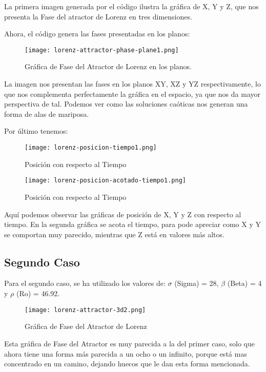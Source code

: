 \documentclass[a4paper]{article}
\begin{document}
La primera imagen generada por el código ilustra la gráfica de X, Y y Z, que nos presenta la Fase del atractor de Lorenz en tres dimensiones. 

Ahora, el código genera las fases presentadas en los planos:
\begin{figure}[h!]
  \centering
  \texttt{[image: lorenz-attractor-phase-plane1.png]}
   \caption{Gráfica de Fase del Atractor de Lorenz en los planos.}
\end{figure}

La imagen nos presentan las fases en los planos XY, XZ y YZ respectivamente, lo que nos complementa perfectamente la gráfica en el espacio, ya que nos da mayor perspectiva de tal. Podemos ver como las soluciones caóticas nos generan una forma de alas de mariposa. 

\pagebreak

Por último tenemos:

\begin{figure}[ht!]
  \centering
  \texttt{[image: lorenz-posicion-tiempo1.png]}
   \caption{Posición con respecto al Tiempo}
\end{figure}

\begin{figure}[ht!]
  \centering
  \texttt{[image: lorenz-posicion-acotado-tiempo1.png]}
  \caption{Posición con respecto al Tiempo}
\end{figure}

Aquí podemos observar las gráficas de posición de X, Y y Z con respecto al tiempo. En la segunda gráfica se acota el tiempo, para pode apreciar como X y Y se comportan muy parecido, mientras que Z está en valores más altos. 

\subsection{Segundo Caso}
Para el segundo caso, se ha utilizado los valores de:
$\sigma$ (Sigma) = 28, $\beta$ (Beta) = 4 y $\rho$ (Ro) = 46.92. 

\begin{figure}[h!]
  \centering
  \texttt{[image: lorenz-attractor-3d2.png]}
   \caption{Gráfica de Fase del Atractor de Lorenz}
\end{figure}

Esta gráfica de Fase del Atractor es muy parecida a la del primer caso, solo que ahora tiene una forma más parecida a un ocho o un infinito, porque está mas concentrado en un camino, dejando huecos que le dan esta forma mencionada.
\end{document}
